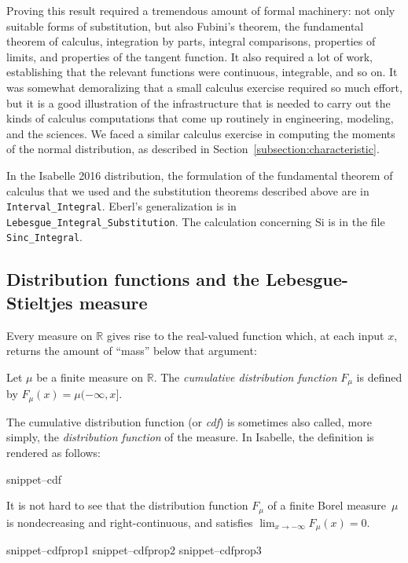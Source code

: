 \documentclass{svjour3}
\newcommand{\RR}{\mathbb{R}}
\newcommand{\fn}[1]{\mathrm{#1}} %
\newcommand{\Snippet}[1]{\csname snippet--#1\endcsname}
\begin{document}
Proving this result required a tremendous amount of formal machinery: not only suitable forms of substitution, but also Fubini's theorem, the fundamental theorem of calculus, integration by parts, integral comparisons, properties of limits, and properties of the tangent function. It also required a lot of work, establishing that the relevant functions were continuous, integrable, and so on. It was somewhat demoralizing that a small calculus exercise required so much effort, but it is a good illustration of the infrastructure that is needed to carry out the kinds of calculus computations that come up routinely in engineering, modeling, and the sciences. We faced a similar calculus exercise in computing the moments of the normal distribution, as described in Section~\ref{subsection:characteristic}.

In the Isabelle 2016 distribution, the formulation of the fundamental theorem of calculus that we used and the substitution theorems described above are in \texttt{Interval\_Integral}. Eberl's generalization is in \texttt{Lebesgue\_Integral\_Substitution}. The calculation concerning $\fn{Si}$ is in the file \texttt{Sinc\_Integral}.

\subsection{Distribution functions and the Lebesgue-Stieltjes measure}
\label{subsection:distribution:functions}

Every measure on $\RR$ gives rise to the real-valued function which, at each input $x$, returns the amount of ``mass'' below that argument:

\begin{definition}
Let $\mu$ be a finite measure on $\RR$. The \emph{cumulative distribution function} $F_\mu$ is defined by $F_\mu(x) = \mu (-\infty, x]$.
\end{definition}
The cumulative distribution function (or \emph{cdf}) is sometimes also called, more simply, the \emph{distribution function} of the measure. In Isabelle, the definition is rendered as follows:

\Snippet{cdf}

It is not hard to see that the distribution function $F_\mu$ of a finite Borel measure~$\mu$ is nondecreasing and right-continuous, and satisfies $\lim_{x \rightarrow -\infty} F_\mu(x) = 0$.

\Snippet{cdfprop1}
\Snippet{cdfprop2}
\Snippet{cdfprop3}
\end{document}

